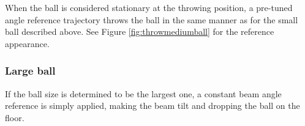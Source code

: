 When the ball is considered stationary at the throwing position, a pre-tuned angle reference trajectory throws the ball in the same manner as for the small ball described above. See Figure \ref{fig:throwmediumball} for the reference appearance.

\subsubsection{Large ball}\label{sec:large_ball_delivery}
If the ball size is determined to be the largest one, a constant beam angle reference is simply applied, making the beam tilt and dropping the ball on the floor.









